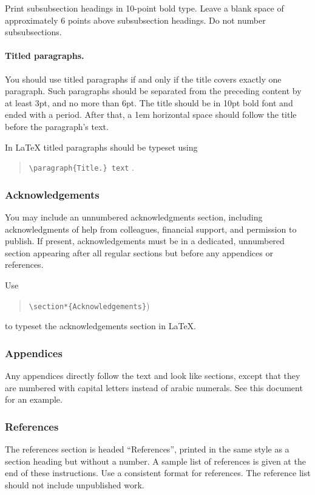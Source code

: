 \documentclass{article}
\begin{document}
Print subsubsection headings in 10-point bold type. Leave a blank
space of approximately 6 points above subsubsection headings. Do not
number subsubsections.

\paragraph{Titled paragraphs.} You should use titled paragraphs if and 
only if the title covers exactly one paragraph. Such paragraphs should be
separated from the preceding content by at least 3pt, and no more than
6pt. The title should be in 10pt bold font and ended with a period. 
After that, a 1em horizontal space should follow the title before 
the paragraph's text.

In \LaTeX{} titled paragraphs should be typeset using
\begin{quote}
{\tt \textbackslash{}paragraph\{Title.\} text} .
\end{quote}

\subsubsection{Acknowledgements}

You may include an unnumbered acknowledgments section, including
acknowledgments of help from colleagues, financial support, and
permission to publish. If present, acknowledgements must be in a dedicated,
unnumbered section appearing after all regular sections but before any
appendices or references.

Use 
\begin{quote}
    {\tt \textbackslash{}section*\{Acknowledgements\}})
\end{quote}
to typeset the acknowledgements section in \LaTeX{}.

\subsubsection{Appendices}

Any appendices directly follow the text and look like sections, except
that they are numbered with capital letters instead of arabic
numerals. See this document for an example.

\subsubsection{References}

The references section is headed ``References'', printed in the same
style as a section heading but without a number. A sample list of
references is given at the end of these instructions. Use a consistent
format for references. The reference list should not include unpublished
work.
\end{document}

